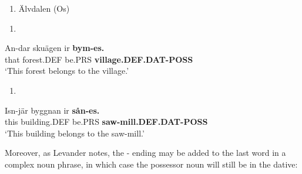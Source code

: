 \begin{enumerate} %
\item 
Älvdalen (Os)

\end{enumerate} %
\setcounter{listLFOxcviiileveli}{0}
\begin{enumerate} %
\item 
\end{enumerate} %
\ea\label{}
\gll An-dar  skuägen  ir  \textbf{bym-es.}\\


that  forest.DEF  be.PRS  \textbf{village.DEF.DAT-POSS}\\ %


‘This forest belongs to the village.’
\z


\begin{enumerate} %
\item 
\end{enumerate} %
\ea\label{}
\gll Isn-jär  byggnan  ir  \textbf{sån-es.}\\


this  building.DEF  be.PRS  \textbf{saw-mill.DEF.DAT-POSS}\\ %


 ‘This building belongs to the saw-mill.’
\z


Moreover, as Levander notes, the \nobreakdash- ending may be added to the last word in a complex noun phrase, in which case the possessor noun will still be in the dative:

